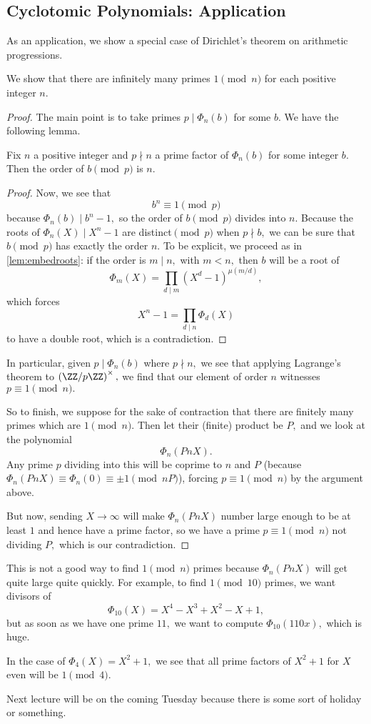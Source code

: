 \documentclass[../notes.tex]{subfiles}
\begin{document}
\subsection{Cyclotomic Polynomials: Application}
As an application, we show a special case of Dirichlet's theorem on arithmetic progressions.
\begin{exe}
	We show that there are infinitely many primes $1\pmod n$ for each positive integer $n.$
\end{exe}
\begin{proof}
	The main point is to take primes $p\mid\Phi_n(b)$ for some $b.$ We have the following lemma.
	\begin{lemma}
		Fix $n$ a positive integer and $p\nmid n$ a prime factor of $\Phi_n(b)$ for some integer $b.$ Then the order of $b\pmod p$ is $n.$
	\end{lemma}
	\begin{proof}
		Now, we see that
		\[b^n\equiv1\pmod p\]
		because $\Phi_n(b)\mid b^n-1,$ so the order of $b\pmod p$ divides into $n.$ Because the roots of $\Phi_n(X)\mid X^n-1$ are distinct$\pmod p$ when $p\nmid b,$ we can be sure that $b\pmod p$ has exactly the order $n.$ To be explicit, we proceed as in \autoref{lem:embedroots}: if the order is $m\mid n,$ with $m<n,$ then $b$ will be a root of
		\[\Phi_m(X)=\prod_{d\mid m}\left(X^d-1\right)^{\mu(m/d)},\]
		which forces
		\[X^n-1=\prod_{d\mid n}\Phi_d(X)\]
		to have a double root, which is a contradiction.
	\end{proof}
	In particular, given $p\mid\Phi_n(b)$ where $p\nmid n,$ we see that applying Lagrange's theorem to $\left(\ZZ/p\ZZ\right)^\times,$ we find that our element of order $n$ witnesses $p\equiv1\pmod n.$

	So to finish, we suppose for the sake of contraction that there are finitely many primes which are $1\pmod n.$ Then let their (finite) product be $P,$ and we look at the polynomial
	\[\Phi_n(PnX).\]
	Any prime $p$ dividing into this will be coprime to $n$ and $P$ (because $\Phi_n(PnX)\equiv\Phi_n(0)\equiv\pm1\pmod{nP}$), forcing $p\equiv1\pmod n$ by the argument above.
	
	But now, sending $X\to\infty$ will make $\Phi_n(PnX)$ number large enough to be at least $1$ and hence have a prime factor, so we have a prime $p\equiv1\pmod n$ not dividing $P,$ which is our contradiction.
\end{proof}
\begin{remark}
	This is not a good way to find $1\pmod n$ primes because $\Phi_n(PnX)$ will get quite large quite quickly. For example, to find $1\pmod{10}$ primes, we want divisors of
	\[\Phi_{10}(X)=X^4-X^3+X^2-X+1,\]
	but as soon as we have one prime $11,$ we want to compute $\Phi_{10}(110x),$ which is huge.
\end{remark}
\begin{example}
	In the case of $\Phi_4(X)=X^2+1,$ we see that all prime factors of $X^2+1$ for $X$ even will be $1\pmod4.$
\end{example}
Next lecture will be on the coming Tuesday because there is some sort of holiday or something.
\end{document}
